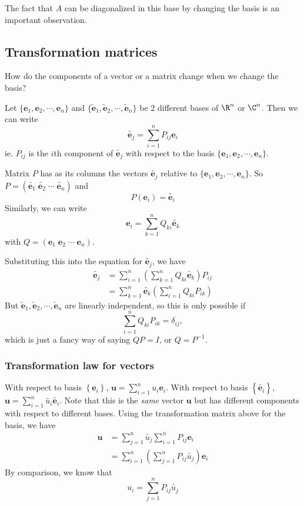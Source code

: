 \documentclass[a4paper]{article}
\begin{document}
  The fact that $A$ can be diagonalized in this base by changing the basis is an important observation.

  \subsection{Transformation matrices}
  How do the components of a vector or a matrix change when we change the basis?

  Let $\{\mathbf{e}_1, \mathbf{e}_2, \cdots, \mathbf{e}_n\}$ and $\{\tilde{\mathbf{e}}_1, \tilde{\mathbf{e}}_2,\cdots,  \tilde{\mathbf{e}}_n\}$ be 2 different bases of $\R^n$ or $\C^n$. Then we can write
  \[
    \tilde{\mathbf{e}_j} = \sum_{i = 1}^n P_{ij}\mathbf{e}_i
  \]
  ie. $P_{ij}$ is the $i$th component of $\tilde{\mathbf{e}_j}$ with respect to the basis $\{\mathbf{e}_1, \mathbf{e}_2, \cdots, \mathbf{e}_n\}$.

  Matrix $P$ has as its columns the vectors $\tilde{\mathbf{e}_j}$ relative to $\{\mathbf{e}_1, \mathbf{e}_2, \cdots, \mathbf{e}_n\}$. So $P = (\tilde{\mathbf{e}_1}\; \tilde{\mathbf{e}_2}\; \cdots \; \tilde{\mathbf{e}_n})$ and 
  \[
    P(\mathbf{e}_i) = \tilde{\mathbf{e}_i}
  \]
  Similarly, we can write 
  \[
    \mathbf{e}_i = \sum_{k = 1}^nQ_{ki} \tilde{\mathbf{e}_k}
  \]
  with $Q = (\mathbf{e}_1\; \mathbf{e}_2\;\cdots\;\mathbf{e}_n)$.

  Substituting this into the equation for $\tilde{\mathbf{e}_j}$, we have
  \begin{align*}
    \tilde{\mathbf{e}_j} &= \sum_{i = 1}^n\left(\sum_{k = 1}^{n} Q_{ki}\tilde{\mathbf{e}_k}\right)P_{ij}\\
    &= \sum_{k = 1}^n \tilde{\mathbf{e}_k} \left(\sum_{i = 1}^n Q_{ki}P_{ik}\right)
  \end{align*}
  But $\tilde{\mathbf{e}}_1, \tilde{\mathbf{e}}_2,\cdots,  \tilde{\mathbf{e}}_n$ are linearly independent, so this is only possible if 
  \[
    \sum_{i = 1}^n Q_{ki}P_{ik} = \delta_{ij},
  \]
  which is just a fancy way of saying $QP = I$, or $Q = P^{-1}$.

  \subsubsection{Transformation law for vectors}
  With respect to basis $\left\{\mathbf{e}_i\right\}$, $\mathbf{u} = \sum_{i = 1}^n u_i\mathbf{e}_i$. 
  With respect to basis $\left\{\tilde{\mathbf{e}_i}\right\}$, $\mathbf{u} = \sum_{i = 1}^n \tilde{u_i}\tilde{\mathbf{e}_i}$. Note that this is the \emph{same} vector $\mathbf{u}$ but has different components with respect to different bases. Using the transformation matrix above for the basis, we have
  \begin{align*}
    \mathbf{u} &= \sum_{j= 1}^n \tilde{u_j} \sum_{i = 1}^{n}P_{ij}\mathbf{e}_i\\
    &= \sum_{i = 1}^n \left(\sum_{j = 1}^n P_{ij}\tilde{u_j}\right) \mathbf{e}_i
  \end{align*}
  By comparison, we know that 
  \[
    u_i = \sum_{j = 1}^n P_{ij}\tilde{u_j}
  \]
\end{document}
